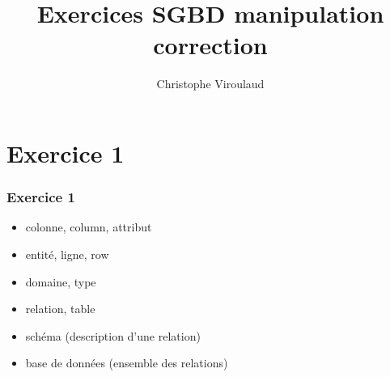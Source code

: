 \documentclass[svgnames,11pt]{beamer}
\author[]{Christophe Viroulaud}
\title{Exercices SGBD manipulation\\correction}
\date{\framebox{\textbf{BDD 05}}}
\institute{Terminale - NSI}
\begin{document}
\begin{frame}
    \titlepage
\end{frame}
\section{Exercice 1}
\begin{frame}
    \frametitle{Exercice 1}

    \begin{itemize}
        \item colonne, column, attribut
        \item entité, ligne, row
        \item domaine, type
        \item relation, table
        \item schéma (description d'une relation)
        \item base de données (ensemble des relations)
    \end{itemize}

\end{frame}
\end{document}
